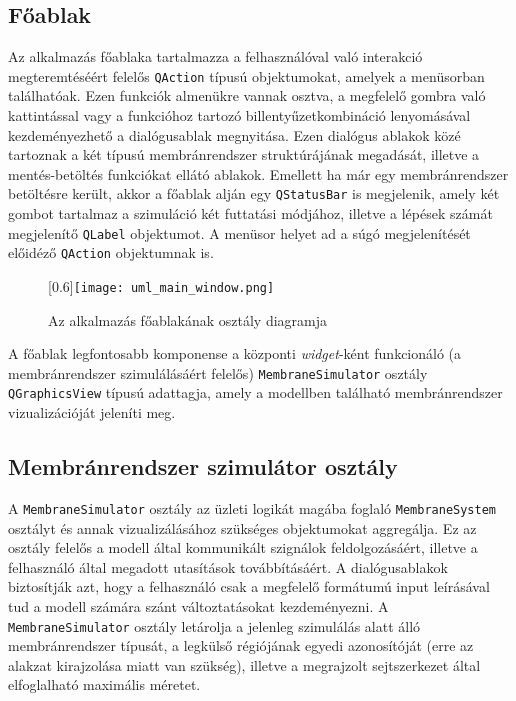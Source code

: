 \subsection{Főablak}

Az alkalmazás főablaka tartalmazza a felhasználóval való interakció megteremtéséért felelős \verb|QAction| típusú objektumokat, amelyek a menüsorban találhatóak. Ezen funkciók almenükre vannak osztva, a megfelelő gombra való kattintással vagy a funkcióhoz tartozó billentyűzetkombináció lenyomásával kezdeményezhető a dialógusablak megnyitása. Ezen dialógus ablakok közé tartoznak a két típusú membránrendszer struktúrájának megadását, illetve a mentés-betöltés funkciókat ellátó ablakok. Emellett ha már egy membránrendszer betöltésre került, akkor a főablak alján egy \verb|QStatusBar| is megjelenik, amely két gombot tartalmaz a szimuláció két futtatási módjához, illetve a lépések számát megjelenítő \verb|QLabel| objektumot.
A menüsor helyet ad a súgó megjelenítését előidéző \verb|QAction| objektumnak is.

\begin{figure}[H]
\centering
	\scalebox{0.6}[0.6]{\texttt{[image: uml\_main\_window.png]}}
	\caption{Az alkalmazás főablakának osztály diagramja}
	\label{fig:uml_mainwindow}
\end{figure}

A főablak legfontosabb komponense a központi \textit{widget}-ként funkcionáló (a membránrendszer szimulálásáért felelős)  \verb|MembraneSimulator| osztály \verb|QGraphicsView| típusú adattagja, amely a modellben található membránrendszer vizualizációját jeleníti meg.

\subsection{Membránrendszer szimulátor osztály}

A  \verb|MembraneSimulator| osztály az üzleti logikát magába foglaló \verb|MembraneSystem| osztályt és annak vizualizálásához szükséges objektumokat aggregálja. Ez az osztály felelős a modell által kommunikált szignálok feldolgozásáért, illetve a felhasználó által megadott utasítások továbbításáért. A dialógusablakok biztosítják azt, hogy a felhasználó csak a megfelelő formátumú input leírásával tud a modell számára szánt változtatásokat kezdeményezni. A \verb|MembraneSimulator| osztály letárolja a jelenleg szimulálás alatt álló membránrendszer típusát, a legkülső régiójának egyedi azonosítóját (erre az alakzat kirajzolása miatt van szükség), illetve a megrajzolt sejtszerkezet által elfoglalható maximális méretet.

